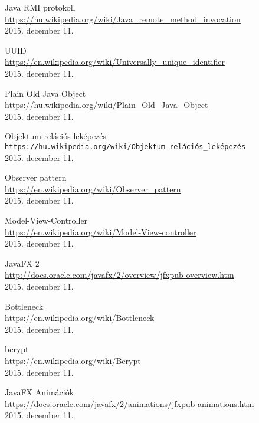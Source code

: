 \begin{thebibliography}{9}
Java RMI protokoll \\
\url{https://hu.wikipedia.org/wiki/Java_remote_method_invocation}\\
2015. december 11.

UUID \\
\url{https://en.wikipedia.org/wiki/Universally_unique_identifier}\\
2015. december 11.

Plain Old Java Object \\
\url{https://hu.wikipedia.org/wiki/Plain_Old_Java_Object}\\
2015. december 11.

Objektum-relációs leképezés \\
\texttt{https://hu.wikipedia.org/wiki/Objektum-relációs\_leképezés}\\
2015. december 11.

Observer pattern \\
\url{https://en.wikipedia.org/wiki/Observer_pattern} \\
2015. december 11.

Model-View-Controller \\
\url{https://en.wikipedia.org/wiki/Model-View-controller}\\
2015. december 11.

JavaFX 2 \\
\url{http://docs.oracle.com/javafx/2/overview/jfxpub-overview.htm}\\
2015. december 11.

Bottleneck \\
\url{https://en.wikipedia.org/wiki/Bottleneck}\\
2015. december 11.

bcrypt \\
\url{https://en.wikipedia.org/wiki/Bcrypt}\\
2015. december 11.

JavaFX Animációk \\
\url{https://docs.oracle.com/javafx/2/animations/jfxpub-animations.htm}\\
2015. december 11.

\end{thebibliography}